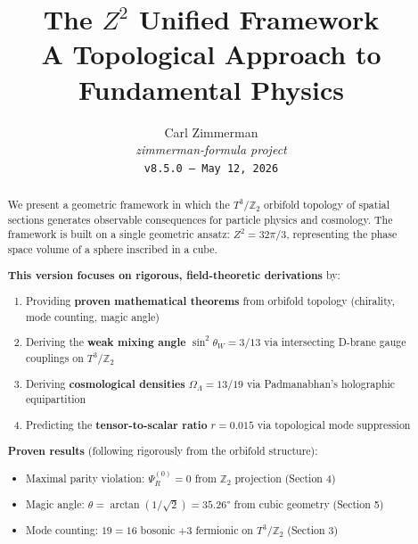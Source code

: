 \documentclass[12pt,a4paper]{article}
\newcommand{\Ztwo}{\mathbb{Z}_2}
\newcommand{\Tthree}{T^3}
\newcommand{\OmegaL}{\Omega_\Lambda}
\newcommand{\sinW}{\sin^2\theta_W}
\newcommand{\Zsq}{Z^2}
\begin{document}
\title{\textbf{The $Z^2$ Unified Framework}\\[0.5em]
\large A Topological Approach to Fundamental Physics}

\author{Carl Zimmerman\\[0.5em]
\small\textit{zimmerman-formula project}\\
\small\texttt{v8.5.0 --- May 12, 2026}}

\date{}

\maketitle

\begin{abstract}

We present a geometric framework in which the $\Tthree/\Ztwo$ orbifold topology of spatial sections generates observable consequences for particle physics and cosmology. The framework is built on a single geometric ansatz: $\Zsq = 32\pi/3$, representing the phase space volume of a sphere inscribed in a cube.

\textbf{This version focuses on rigorous, field-theoretic derivations} by:
\begin{enumerate}[itemsep=0pt]
    \item Providing \textbf{proven mathematical theorems} from orbifold topology (chirality, mode counting, magic angle)
    \item Deriving the \textbf{weak mixing angle} $\sinW = 3/13$ via intersecting D-brane gauge couplings on $\Tthree/\Ztwo$
    \item Deriving \textbf{cosmological densities} $\OmegaL = 13/19$ via Padmanabhan's holographic equipartition
    \item Predicting the \textbf{tensor-to-scalar ratio} $r = 0.015$ via topological mode suppression
\end{enumerate}

\textbf{Proven results} (following rigorously from the orbifold structure):
\begin{itemize}[itemsep=0pt]
    \item Maximal parity violation: $\Psi_R^{(0)} = 0$ from $\Ztwo$ projection (Section 4)
    \item Magic angle: $\theta = \arctan(1/\sqrt{2}) = 35.26°$ from cubic geometry (Section 5)
    \item Mode counting: $19 = 16$ bosonic $+ 3$ fermionic on $\Tthree/\Ztwo$ (Section 3)
\end{itemize}


\end{abstract}
\end{document}
